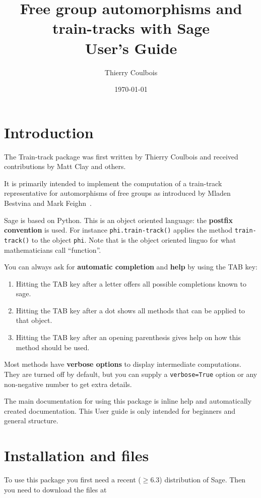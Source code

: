 \documentclass[10pt,a4paper]{article}
\title{Free group automorphisms and train-tracks with Sage\\
User's Guide}
\author{Thierry Coulbois}
\date{\today}
\begin{document}
\maketitle



\section{Introduction}

The Train-track package was first written by Thierry Coulbois and
received contributions by Matt Clay and others.

It is primarily intended to implement the computation of a train-track
representative for automorphisms of free groups as introduced by
Mladen Bestvina and Mark Feighn~\cite{bf-train-track}.


Sage is based on Python. This is an object oriented language: the
\textbf{postfix convention} is used. For instance
\texttt{phi.train-track()} applies the method \texttt{train-track()}
to the object \texttt{phi}. Note that  is the object
oriented linguo for what mathematicians call ``function''.

You can always ask for \textbf{automatic completion} and \textbf{help} by using the TAB key: 
\begin{enumerate}
\item Hitting the TAB key after a letter offers all possible
  completions known to sage.
\item Hitting the TAB key after a dot shows all methods that can be
  applied to that object.
\item Hitting the TAB key after an opening parenthesis gives help on
  how this method should be used.
\end{enumerate}

Most methods have \textbf{verbose options} to display intermediate
computations. They are turned off by default, but you can supply a
\texttt{verbose=True} option or any non-negative number to get extra
details.

The main documentation for using this package is inline help and
automatically created documentation. This User guide is only
intended for beginners and general structure.

\section{Installation and files}

To use this package you first need a recent ($\geq 6.3$) distribution
of Sage. Then you need to download the files at
\end{document}
